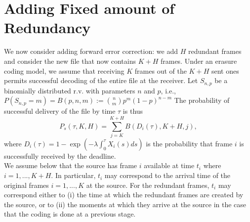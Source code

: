 \documentclass[10pt,twocolumn,conference,final]{IEEEtran}
\begin{document}
\section{Adding Fixed amount of Redundancy}\label{sec:redundancy}
We now consider adding forward error correction: we add $H$ redundant frames and consider
the new file that now contains $K+H$ frames. Under an erasure coding model, we assume that
receiving $K$ frames out of the $K+H$ sent ones permits successful decoding of the entire
file at the receiver.
Let $S_{n,p}$ be a binomially distributed r.v. with parameters $n$ and $p$, i.e., 
\(
P(S_{n,p}=m) = B(p,n,m) := { n \choose m } p^m (1-p)^{n-m}
\)
The probability of successful delivery of the file
by time $\tau$ is thus
\[
P_s (\tau,K,H) = \sum_{j=K}^{K+H} B( D_i(\tau) , K+H , j  ),
\]
where $D_i(\tau) = 1 - \exp ( - \lambda \int_0^\tau X_i(s) ds)$ is the probability
that frame $i$ is successfully received by the deadline.
\\
We assume below that the source has frame $i$ available at time
$t_i$ where $i=1,...,K+H$. In particular,
$t_i$ may correspond to the arrival time
of the original frames $i=1,...,K$
at the source. For the redundant frames, $t_i$
may correspond either to (i) the time at which the redundant
frames are created by the source, or to (ii) the moments at which
they arrive at the source in the case that the coding is done at
a previous stage.
\end{document}
